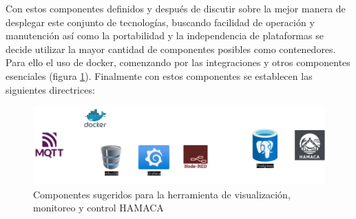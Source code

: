 Con estos componentes definidos y después de discutir sobre la mejor manera de desplegar este conjunto de tecnologías, buscando facilidad de operación y manutención así como la portabilidad y la independencia de plataformas se decide utilizar la mayor cantidad de componentes posibles como contenedores. Para ello el uso de docker\cite{docker}, comenzando por las integraciones y otros componentes esenciales (figura \ref{fig:componentes_hamaca}). Finalmente con estos componentes se establecen las siguientes directrices:

\begin{figure}[!htb]
\centering
\includegraphics[scale=0.45]{./Figuras/componentes_hamaca.png}
\caption{Componentes sugeridos para la herramienta de visualización, monitoreo y control HAMACA}
\label{fig:componentes_hamaca}
\vspace*{-10pt}
\end{figure}


